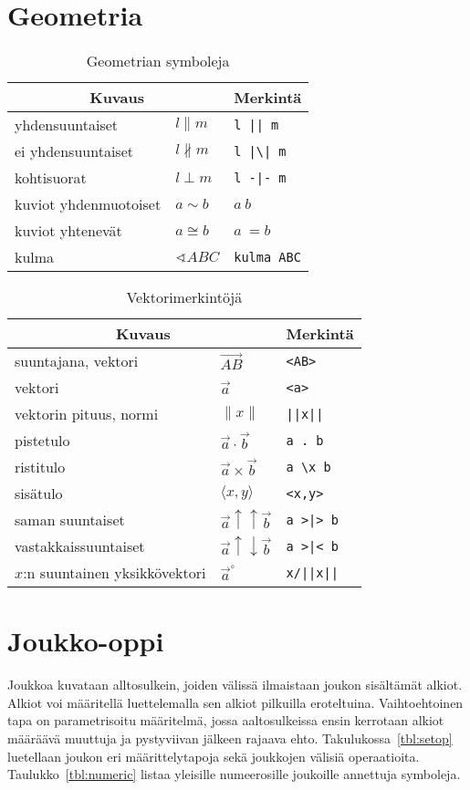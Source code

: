 \section{Geometria}
\begin{table}[ht]
\begin{tabular}{ l|l|l }
\multicolumn{2}{c}{Kuvaus} & Merkintä \\ \hline
yhdensuuntaiset & $l \parallel m$ & \verb$l || m$ \\
ei yhdensuuntaiset & $l \nparallel m$ & \verb$l |\| m$ \\
kohtisuorat & $l \perp m$ & \verb$l -|- m$ \\
kuviot yhdenmuotoiset & $a\sim b$ & $a ~ b$ \\
kuviot yhtenevät & $a\cong b$ & $a ~= b$ \\
kulma & $\sphericalangle ABC$ & \verb$kulma ABC$ \\
\end{tabular}
\caption{Geometrian symboleja}
\label{tbl:geometry}
\end{table}

\begin{table}[ht]
\begin{tabular}{ ll|l }
\multicolumn{2}{c}{Kuvaus} & Merkintä \\ \hline
suuntajana, vektori & $\overrightarrow{AB}$ & \verb$<AB>$ \\
vektori & $\vec{a}$ & \verb$<a>$ \\
vektorin pituus, normi & $\| x\|$ & \verb$||x||$ \\
pistetulo & $\vec{a} \cdot \vec{b}$ & \verb$a . b$ \\
ristitulo & $\vec{a} \times \vec{b}$ & \verb$a \x b$ \\
sisätulo & $\langle x,y\rangle$ & \verb$<x,y>$ \\
saman suuntaiset & $\vec{a} \uparrow\uparrow \vec{b}$ & \verb$a >|> b$ \\
vastakkaissuuntaiset & $\vec{a} \uparrow\downarrow \vec{b}$ & \verb$a >|< b$ \\
$x$:n suuntainen yksikkövektori & $\vec{a}^{\circ}$ & \verb$x/||x||$ \\
\end{tabular}
\caption{Vektorimerkintöjä}
\label{tbl:vectors}
\end{table}

\section{Joukko-oppi}
Joukkoa kuvataan alltosulkein, joiden välissä ilmaistaan joukon sisältämät alkiot.
Alkiot voi määritellä luettelemalla sen alkiot pilkuilla eroteltuina.
Vaihtoehtoinen tapa on parametrisoitu määritelmä, jossa aaltosulkeissa ensin kerrotaan alkiot määräävä muuttuja ja pystyviivan jälkeen rajaava ehto.
Takulukossa~\ref{tbl:setop} luetellaan joukon eri määrittelytapoja sekä joukkojen välisiä operaatioita.
Taulukko~\ref{tbl:numeric} listaa yleisille numeerosille joukoille annettuja symboleja.

